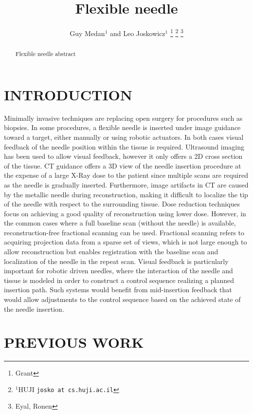 \documentclass[letterpaper, 10 pt, conference]{ieeeconf}  %
\title{\LARGE \bf
Flexible needle
}
\author{Guy Medan$^{1}$ and Leo Joskowicz$^{1}$%
\thanks{Grant}%
\thanks{$^{1}$HUJI
        {\tt\small josko at cs.huji.ac.il}}%
\thanks{Eyal, Ronen}%
}
\begin{document}
\maketitle
\thispagestyle{empty}
\pagestyle{empty}


\begin{abstract}

Flexible needle abstract

\end{abstract}


\section{INTRODUCTION}

Minimally invasive techniques are replacing open surgery for procedures such as biopsies.
In some procedures, a flexible needle is inserted under image guidance toward a target, either manually or using robotic actuators. 
In both cases visual feedback of the needle position within the tissue is required. 
Ultrasound imaging has been used to allow visual feedback, however it only offers a 2D cross section of the tissue.
CT guidance offers a 3D view of the needle insertion procedure at the expense of a large X-Ray dose to the patient since multiple scans are required as the needle is gradually inserted. Furthermore, image artifacts in CT are caused by the metallic needle during reconstruction, making it difficult to localize the tip of the needle with respect to the surrounding tissue. 
Dose reduction techniques focus on achieving a good quality of reconstruction using lower dose. However, in the common cases where a full baseline scan (without the needle) is available, reconstruction-free fractional scanning can be used. Fractional scanning refers to acquiring projection data from a sparse set of views, which is not large enough to allow reconstruction but enables registration with the baseline scan and localization of the needle in the repeat scan.
Visual feedback is particularly important for robotic driven needles, where the interaction of the needle and tissue is modeled in order to construct a control sequence realizing a planned insertion path. Such systems would benefit from mid-insertion feedback that would allow adjustments to the control sequence based on the achieved state of the needle insertion.

\section{PREVIOUS WORK}
\end{document}
